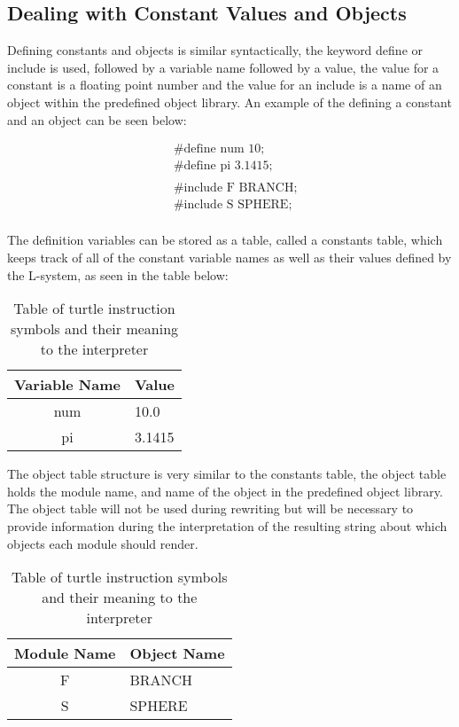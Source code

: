 \subsection{Dealing with Constant Values and Objects}

Defining constants and objects is similar syntactically, the keyword define or include is used, followed by a variable name followed by a value, the value for a constant is a floating point number and the value for an include is a name of an object within the predefined object library. An example of the defining a constant and an object can be seen below: 

\begin{equation} \label{constant and object example}
\begin{aligned}
	&\text{\#define num 10;}\\
	&\text{\#define pi 3.1415;}\\
	&\\
	&\text{\#include F BRANCH;}\\
	&\text{\#include S SPHERE;}\\
\end{aligned}
\end{equation}

The definition variables can be stored as a table, called a constants table, which keeps track of all of the constant variable names as well as their values defined by the L-system, as seen in the table below: 

\begin{table}[h!] \center
\begin{tabular}{ | c | l | }
\hline
	Variable Name 	& Value\\  
\hline
\hline
	num 				& 10.0\\
\hline
	pi					& 3.1415\\
\hline
\end{tabular}
\caption{Table of turtle instruction symbols and their meaning to the interpreter}
\label{constants table}
\end{table}
\FloatBarrier

The object table structure is very similar to the constants table, the object table holds the module name, and name of the object in the predefined object library. The object table will not be used during rewriting but will be necessary to provide information during the interpretation of the resulting string about which objects each module should render. 

\begin{table}[h!] \center
\begin{tabular}{ | c | l | }
\hline
	Module Name	& Object Name\\  
\hline
\hline
	F 				& BRANCH\\
\hline
	S				& SPHERE\\
\hline
\end{tabular}
\caption{Table of turtle instruction symbols and their meaning to the interpreter}
\label{constants table}
\end{table}
\FloatBarrier

